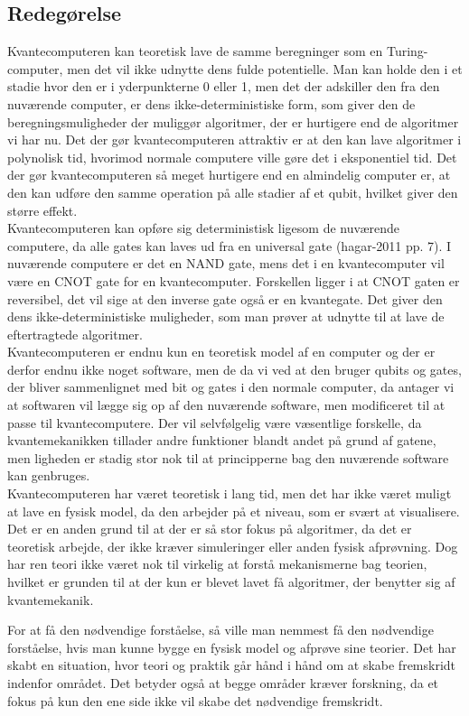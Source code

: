 \subsection{Redegørelse}
Kvantecomputeren kan teoretisk lave de samme beregninger som en Turing-computer, men det vil ikke udnytte dens fulde potentielle. Man kan holde den i et stadie hvor den er i yderpunkterne 0 eller 1, men det der adskiller den fra den nuværende computer, er dens ikke-deterministiske form, som giver den de beregningsmuligheder der muliggør algoritmer, der er hurtigere end de algoritmer vi har nu. Det der gør kvantecomputeren attraktiv er at den kan lave algoritmer i polynolisk tid, hvorimod normale computere ville gøre det i eksponentiel tid. Det der gør kvantecomputeren så meget hurtigere end en almindelig computer er, at den kan udføre den samme operation på alle stadier af et qubit, hvilket giver den større effekt.
\\
Kvantecomputeren kan opføre sig deterministisk ligesom de nuværende computere, da alle gates kan laves ud fra en universal gate (hagar-2011 pp. 7). I nuværende computere er det en NAND gate, mens det i en kvantecomputer vil være en CNOT gate for en kvantecomputer. Forskellen ligger i at CNOT gaten er reversibel, det vil sige at den inverse gate også er en kvantegate. Det giver den dens ikke-deterministiske muligheder, som man prøver at udnytte til at lave de eftertragtede algoritmer. 
\\
Kvantecomputeren er endnu kun en teoretisk model af en computer og der er derfor endnu ikke noget software, men de da vi ved at den bruger qubits og gates, der bliver sammenlignet med bit og gates i den normale computer, da antager vi at softwaren vil lægge sig op af den nuværende software, men modificeret til at passe til kvantecomputere. Der vil selvfølgelig være væsentlige forskelle, da kvantemekanikken tillader andre funktioner blandt andet på grund af gatene, men ligheden er stadig stor nok til at principperne bag den nuværende software kan genbruges.
\\
Kvantecomputeren har været teoretisk i lang tid, men det har ikke været muligt at lave en fysisk model, da den arbejder på et niveau, som er svært at visualisere. Det er en anden grund til at der er så stor fokus på algoritmer, da det er teoretisk arbejde, der ikke kræver simuleringer eller anden fysisk afprøvning. Dog har ren teori ikke været nok til virkelig at forstå mekanismerne bag teorien, hvilket er grunden til at der kun er blevet lavet få algoritmer, der benytter sig af kvantemekanik.

For at få den nødvendige forståelse, så ville man nemmest få den nødvendige forståelse, hvis man kunne bygge en fysisk model og afprøve sine teorier. Det har skabt en situation, hvor teori og praktik går hånd i hånd om at skabe fremskridt indenfor området. Det betyder også at begge områder kræver forskning, da et fokus på kun den ene side ikke vil skabe det nødvendige fremskridt.\cite{hagar2011}
